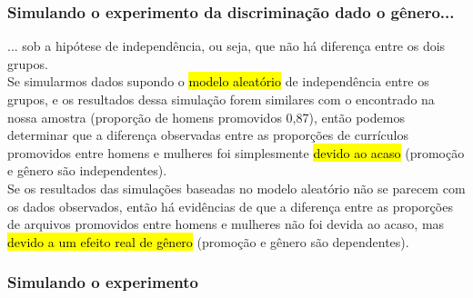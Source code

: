 
\begin{frame}
\frametitle{Simulando o experimento da discriminação dado o gênero...}
\justifying
... sob a hipótese de independência, ou seja, que não há diferença entre os dois grupos. \\

\vspace{0.5cm}
\justifying
Se simularmos dados supondo o \hl{modelo aleatório} de independência entre os grupos, e os resultados dessa simulação forem similares com o encontrado na nossa amostra (proporção de homens promovidos 0,87), então podemos determinar que a diferença observadas entre as proporções de currículos promovidos entre homens e mulheres foi simplesmente \hl{devido ao acaso} (promoção e gênero são independentes). \\

\vspace{0.5cm}
\justifying
Se os resultados das simulações baseadas no modelo aleatório não se parecem com os dados observados, então há evidências de que a diferença entre as proporções de arquivos promovidos entre homens e mulheres não foi devida ao acaso, mas \hl{devido a um efeito real de gênero} (promoção e gênero são dependentes).

\end{frame}


\begin{frame}
\frametitle{Simulando o experimento}
\justifying
{}
\end{frame}

